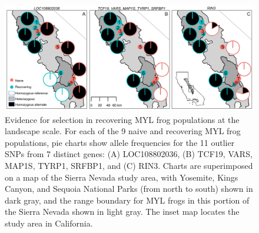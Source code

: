 \documentclass[9pt,twocolumn,twoside,lineno]{pnas-new}
\begin{document}
\showacknow{} %



\clearpage
\begin{figure}

{\centering \includegraphics[width=\textwidth]{figures/allele_maps.png}

}

\caption{\label{fig-allelefrequencies}Evidence for selection in
recovering MYL frog populations at the landscape scale. For each of the
9 naive and recovering MYL frog populations, pie charts show allele
frequencies for the 11 outlier SNPs from 7 distinct genes: (A)
LOC108802036, (B) TCF19, VARS, MAP1S, TYRP1, SRFBP1, and (C) RIN3.
Charts are superimposed on a map of the Sierra Nevada study area, with
Yosemite, Kings Canyon, and Sequoia National Parks (from north to south)
shown in dark gray, and the range boundary for MYL frogs in this portion
of the Sierra Nevada shown in light gray. The inset map locates the
study area in California.}

\end{figure}

\newpage
\end{document}
